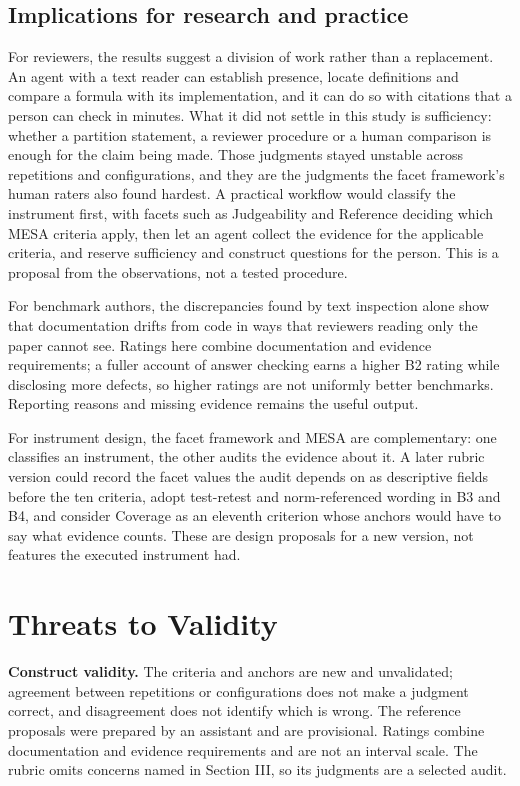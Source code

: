 \documentclass[10pt,conference]{IEEEtran}
\begin{document}
\subsection{Implications for research and practice}
For reviewers, the results suggest a division of work rather than a replacement. An agent with a text reader can establish presence, locate definitions and compare a formula with its implementation, and it can do so with citations that a person can check in minutes. What it did not settle in this study is sufficiency: whether a partition statement, a reviewer procedure or a human comparison is enough for the claim being made. Those judgments stayed unstable across repetitions and configurations, and they are the judgments the facet framework's human raters also found hardest. A practical workflow would classify the instrument first, with facets such as Judgeability and Reference deciding which MESA criteria apply, then let an agent collect the evidence for the applicable criteria, and reserve sufficiency and construct questions for the person. This is a proposal from the observations, not a tested procedure.

For benchmark authors, the discrepancies found by text inspection alone show that documentation drifts from code in ways that reviewers reading only the paper cannot see. Ratings here combine documentation and evidence requirements; a fuller account of answer checking earns a higher B2 rating while disclosing more defects, so higher ratings are not uniformly better benchmarks. Reporting reasons and missing evidence remains the useful output.

For instrument design, the facet framework and MESA are complementary: one classifies an instrument, the other audits the evidence about it. A later rubric version could record the facet values the audit depends on as descriptive fields before the ten criteria, adopt test-retest and norm-referenced wording in B3 and B4, and consider Coverage as an eleventh criterion whose anchors would have to say what evidence counts. These are design proposals for a new version, not features the executed instrument had.

\section{Threats to Validity}
\textbf{Construct validity.} The criteria and anchors are new and unvalidated; agreement between repetitions or configurations does not make a judgment correct, and disagreement does not identify which is wrong. The reference proposals were prepared by an assistant and are provisional. Ratings combine documentation and evidence requirements and are not an interval scale. The rubric omits concerns named in Section III, so its judgments are a selected audit.
\end{document}
